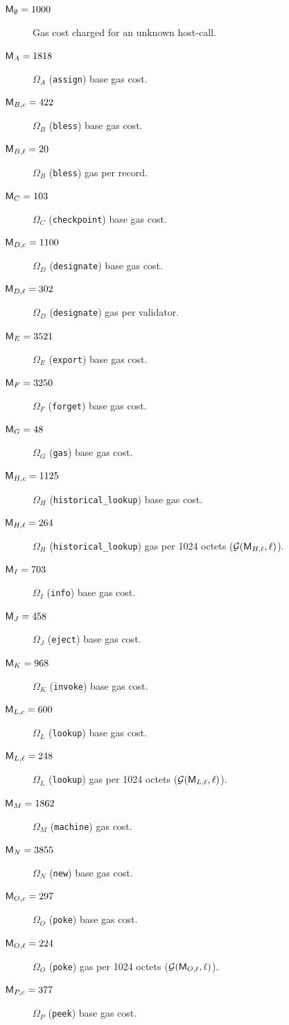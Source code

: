 \begin{description}
  \item[$\mathsf{M}_\emptyset = 1000$] Gas cost charged for an unknown host-call.
  \item[$\mathsf{M}_A = 1818$] $\Omega_A$ (\texttt{assign}) base gas cost.
  \item[$\mathsf{M}_{B,c} = 422$] $\Omega_B$ (\texttt{bless}) base gas cost.
  \item[$\mathsf{M}_{B,\ell} = 20$] $\Omega_B$ (\texttt{bless}) gas per record.
  \item[$\mathsf{M}_C = 103$] $\Omega_C$ (\texttt{checkpoint}) base gas cost.
  \item[$\mathsf{M}_{D,c} = 1100$] $\Omega_D$ (\texttt{designate}) base gas cost.
  \item[$\mathsf{M}_{D,\ell} = 302$] $\Omega_D$ (\texttt{designate}) gas per validator.
  \item[$\mathsf{M}_E = 3521$] $\Omega_E$ (\texttt{export}) base gas cost.
  \item[$\mathsf{M}_F = 3250$] $\Omega_F$ (\texttt{forget}) base gas cost.
  \item[$\mathsf{M}_G = 48$] $\Omega_G$ (\texttt{gas}) base gas cost.
  \item[$\mathsf{M}_{H,c} = 1125$] $\Omega_H$ (\texttt{historical\_lookup}) base gas cost.
  \item[$\mathsf{M}_{H,\ell} = 264$] $\Omega_H$ (\texttt{historical\_lookup}) gas per 1024 octets ($\mathcal{G}(\mathsf{M}_{H,\ell}, \ell)$).
  \item[$\mathsf{M}_I = 703$] $\Omega_I$ (\texttt{info}) base gas cost.
  \item[$\mathsf{M}_J = 458$] $\Omega_J$ (\texttt{eject}) base gas cost.
  \item[$\mathsf{M}_K = 968$] $\Omega_K$ (\texttt{invoke}) base gas cost.
  \item[$\mathsf{M}_{L,c} = 600$] $\Omega_L$ (\texttt{lookup}) base gas cost.
  \item[$\mathsf{M}_{L,\ell} = 248$] $\Omega_L$ (\texttt{lookup}) gas per 1024 octets ($\mathcal{G}(\mathsf{M}_{L,\ell}, \ell)$).
  \item[$\mathsf{M}_{M} = 1862$] $\Omega_M$ (\texttt{machine}) gas cost.
  \item[$\mathsf{M}_N = 3855$] $\Omega_N$ (\texttt{new}) base gas cost.
  \item[$\mathsf{M}_{O,c} = 297$] $\Omega_O$ (\texttt{poke}) base gas cost.
  \item[$\mathsf{M}_{O,\ell} = 224$] $\Omega_O$ (\texttt{poke}) gas per 1024 octets ($\mathcal{G}(\mathsf{M}_{O,\ell}, \ell)$).
  \item[$\mathsf{M}_{P,c} = 377$] $\Omega_P$ (\texttt{peek}) base gas cost.

\end{description}

